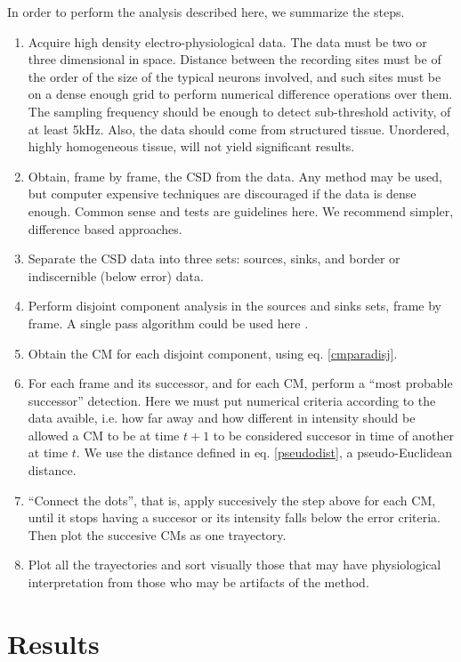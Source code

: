 \documentclass{article}
\begin{document}
 In order to perform the analysis described here, we summarize the steps.
 \begin{enumerate}
 \item Acquire high density electro-physiological data. The data must be two or three dimensional in space. Distance between the recording sites must be of the order of the size of the typical neurons involved, and such sites must be on a dense enough grid to perform numerical difference operations over them. The sampling frequency should be enough to detect sub-threshold activity, of at least 5kHz. Also, the data should come from structured tissue. Unordered, highly homogeneous tissue, will not yield significant results. 
\item Obtain, frame by frame, the CSD from the data. Any method may be used, but computer expensive techniques are discouraged if the data is dense enough. Common sense and tests are guidelines here. We recommend simpler, difference based approaches.
\item Separate the CSD data into three sets: sources, sinks, and border or indiscernible (below error) data.
\item Perform disjoint component analysis in the sources and sinks sets, frame by frame.
  A single pass algorithm could be used here \cite{Vincent91, Abubaker07}.
\item  Obtain the CM for each disjoint component, using eq. \ref{cmparadisj}.
\item For each frame and its successor, and for each CM, perform a ``most probable successor'' detection. Here we must put numerical criteria according to the data avaible, i.e. how far away and how different in intensity should be allowed a CM to be at time $t+1$ to be considered succesor in time of another at time $t$. We use the distance defined in eq. \ref{pseudodist}, a pseudo-Euclidean distance. 
\item ``Connect the dots'', that is, apply succesively the step above for each CM, until it stops having a succesor or its intensity falls below the error criteria. Then plot the succesive CMs as one trayectory.
\item Plot all the trayectories and sort visually those that may have physiological interpretation from those who may be artifacts of the method. 
\end{enumerate}


 
\section{Results}
\end{document}
